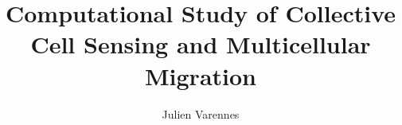 \documentclass[ece,dissertation]{puthesis}
\title{Computational Study of Collective Cell Sensing and Multicellular Migration}
\author{Julien Varennes}{Varennes, Julien}
\begin{document}
\volume







% 



% 
% 
% 
% 
% 
% 

% 
\end{document}
